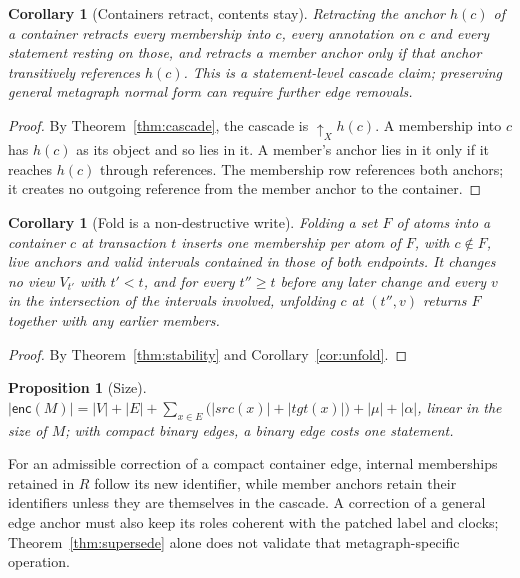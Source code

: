 \documentclass[11pt]{article}
\theoremstyle{plain}
\newtheorem{proposition}[theorem]{Proposition}
\newtheorem{corollary}[theorem]{Corollary}
\theoremstyle{definition}
\theoremstyle{remark}
\newcommand{\dep}{{\uparrow}}            %
\newcommand{\enc}{\mathsf{enc}}
\begin{document}
\begin{corollary}[Containers retract, contents stay]\label{cor:container}
Retracting the anchor $h(c)$ of a container retracts every membership into $c$,
every annotation on $c$ and every statement resting on those, and retracts a
member anchor only if that anchor transitively references $h(c)$. This is a
statement-level cascade claim; preserving general metagraph normal form can
require further edge removals.
\end{corollary}

\begin{proof}
By Theorem~\ref{thm:cascade}, the cascade is $\dep_X h(c)$. A membership into $c$
has $h(c)$ as its object and so lies in it. A member's anchor lies in it only if
it reaches $h(c)$ through references. The membership row references both anchors;
it creates no outgoing reference from the member anchor to the container.
\end{proof}

\begin{corollary}[Fold is a non-destructive write]\label{cor:fold}
Folding a set $F$ of atoms into a container $c$ at transaction $t$ inserts one
membership per atom of $F$, with $c\notin F$, live anchors and valid intervals
contained in those of both endpoints. It changes no view $V_{t'}$ with $t'<t$, and for every
$t''\ge t$ before any later change and every $v$ in the intersection of the
intervals involved, unfolding $c$ at $(t'',v)$ returns $F$ together with any
earlier members.
\end{corollary}

\begin{proof}
By Theorem~\ref{thm:stability} and Corollary~\ref{cor:unfold}.
\end{proof}

\begin{proposition}[Size]\label{prop:size}
$|\enc(M)|=|V|+|E|+\sum_{x\in E}\bigl(|\mathit{src}(x)|+|\mathit{tgt}(x)|\bigr)+|\mu|+|\alpha|$,
linear in the size of $M$; with compact binary edges, a binary edge costs one
statement.
\end{proposition}

For an admissible correction of a compact container edge, internal memberships
retained in $R$ follow its new identifier, while member anchors retain their
identifiers unless they are themselves in the cascade. A correction of a general
edge anchor must also keep its roles coherent with the patched label and clocks;
Theorem~\ref{thm:supersede} alone does not validate that metagraph-specific operation.
\end{document}
